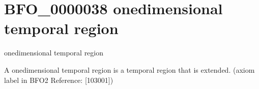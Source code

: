 \documentclass[letterpaper,10pt,english]{sphinxmanual}
\begin{document}
\begin{sphinxShadowBox}

\sphinxAtStartPar
{}
\end{sphinxShadowBox}
\begin{quote}
\label{\detokenize{doc-BFO_0000038:bfo-0000038}}\label{\detokenize{doc-BFO_0000038:one-dimensional-temporal-region}}\label{\detokenize{doc-BFO_0000038:bfo-0000038}}
\ignorespaces \end{quote}


\section{BFO\_0000038 \sphinxhyphen{} one\sphinxhyphen{}dimensional temporal region}
\label{\detokenize{doc-BFO_0000038:bfo-0000038-one-dimensional-temporal-region}}\label{\detokenize{doc-BFO_0000038:index-0}}\label{\detokenize{doc-BFO_0000038::doc}}
\begin{sphinxShadowBox}

\sphinxAtStartPar
one\sphinxhyphen{}dimensional temporal region
\end{sphinxShadowBox}

\begin{sphinxShadowBox}

\sphinxAtStartPar
A one\sphinxhyphen{}dimensional temporal region is a temporal region that is extended. (axiom label in BFO2 Reference: {[}103\sphinxhyphen{}001{]})
\end{sphinxShadowBox}

\begin{sphinxShadowBox}

\sphinxAtStartPar
{}
\end{sphinxShadowBox}
\begin{quote}
\label{\detokenize{doc-BFO_0000040:bfo-0000040}}\label{\detokenize{doc-BFO_0000040:material-entity}}\label{\detokenize{doc-BFO_0000040:bfo-0000040}}
\ignorespaces \end{quote}
\end{document}
